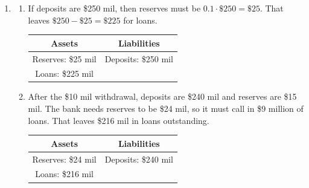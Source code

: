 \documentclass{article}
\begin{document}
\begin{enumerate}
\begin{enumerate}
	\item Decrease -- the Fed takes the money it receives out of circulation, so the money supply decreases.
	
	\item Increase -- when people deposit their currency at banks, banks then make loans using the deposits. The process of taking deposits and making loans generates money, so the money supply increases.
	
	\item Decrease -- an increase in reserves leads to an increase in the reserve ratio. An increase in the reserve ratio decreases the money multiplier. When the money multiplier decreases, banks create less money, so the money supply shrinks. 
	
	\item Decrease -- the Fed increases its target for the federal funds rate by increasing the interest it pays on reserves. When the Fed increases the interest it pays on reserves, the money supply decreases for the reasons in part (c). 
	
	\end{enumerate}
	
\setcounter{enumi}{3}
\item

	\begin{enumerate}
	
	\item If deposits are \$250 mil, then reserves must be $0.1\cdot \$250 = \$25$. That leaves $\$250 - \$25 = \$225$ for loans.
	
	\bigskip
	
		\begin{tabular}{c | c}
		Assets & Liabilities \\
		\hline
		Reserves: \$25 mil & Deposits: \$250 mil \\
		Loans: \$225 mil
		\end{tabular}
		
	\item After the \$10 mil withdrawal, deposits are \$240 mil and reserves are \$15 mil. The bank needs reserves to be \$24 mil, so it must call in \$9 million of loans. That leaves \$216 mil in loans outstanding.
	
	\bigskip
	
		\begin{tabular}{c | c}
		Assets & Liabilities \\
		\hline
		Reserves: \$24 mil & Deposits: \$240 mil \\
		Loans: \$216 mil
		\end{tabular}
		

\end{enumerate}
\end{enumerate}
\end{document}
